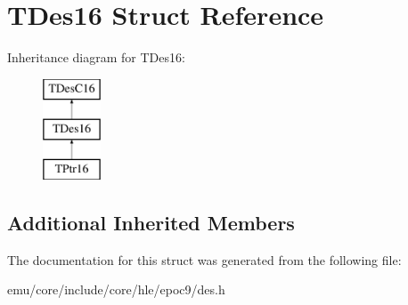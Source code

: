 \hypertarget{struct_t_des16}{}\section{T\+Des16 Struct Reference}
\label{struct_t_des16}
Inheritance diagram for T\+Des16\+:\begin{figure}[H]
\begin{center}
\leavevmode
\includegraphics[height=3.000000cm]{struct_t_des16}
\end{center}
\end{figure}
\subsection*{Additional Inherited Members}


The documentation for this struct was generated from the following file\+:\begin{DoxyCompactItemize}
\item 
emu/core/include/core/hle/epoc9/des.\+h\end{DoxyCompactItemize}
